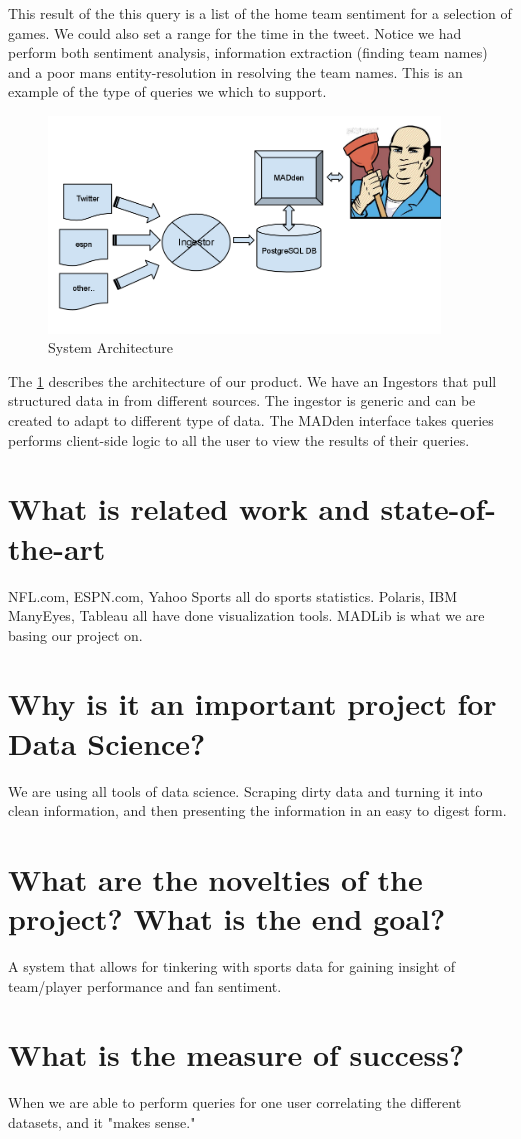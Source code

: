 \documentclass{article}
\begin{document}
This result of the this query is a list of the home team sentiment for
a selection of games. We could also set a range for the time in the tweet.
Notice we had perform both sentiment analysis, information extraction (finding
team names) and a poor mans entity-resolution in resolving the team names.
This is an example of the type of queries we which to support.

\begin{figure}
	\begin{center}
\includegraphics[width=104mm]{architecture-1.png}
\caption{System Architecture}
\label{fig:architecture}
\end{center}
\end{figure}


The \ref{fig:architecture} describes the architecture of our product.
We have an Ingestors that pull structured data in from different sources.
The ingestor is generic and can be created to adapt to different type of 
data. The MADden interface takes queries performs client-side logic to all
the user to view the results of their queries.

	\section{What is related work and state-of-the-art}
	NFL.com, ESPN.com, Yahoo Sports all do sports statistics. 
	Polaris, IBM ManyEyes, Tableau all have done visualization tools.
	MADLib is what we are basing our project on.
	\section{Why is it an important project for Data Science?}
	We are using all tools of data science. Scraping dirty data and turning
	it into clean information, and then presenting the information in an easy
	to digest form.
	\section{What are the novelties of the project? What is the end goal?}
	A system that allows for tinkering with sports data for gaining insight 
	of team/player performance and fan sentiment.
	\section{What is the measure of success?}
	When we are able to perform queries for one user correlating the
	different datasets, and it "makes sense."
	 
\end{document}
